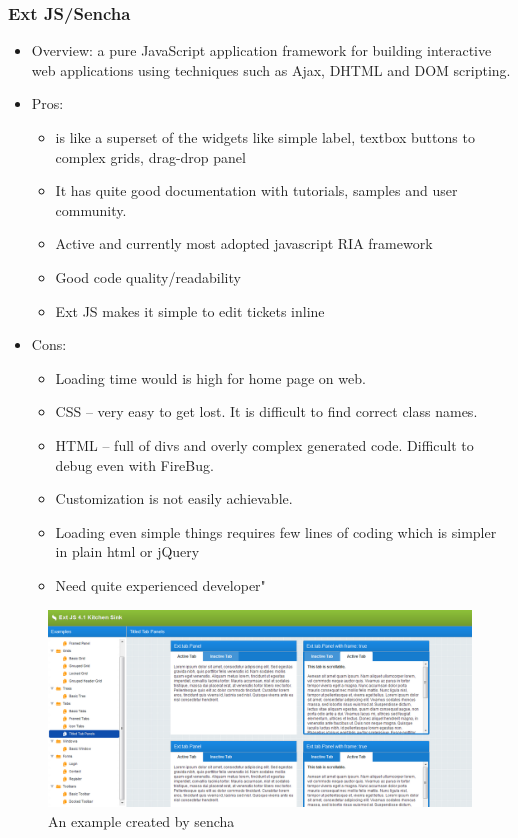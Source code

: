 \documentclass[14pt,a4paper]{extreport}
\begin{document}
		\subsubsection{Ext JS/Sencha}
			\begin{itemize}
				\item Overview:  a pure JavaScript application framework for building interactive web applications using techniques such as Ajax, DHTML and DOM scripting.
				\item Pros: 
					\begin{itemize}
						\item is like a superset of the widgets like simple label, textbox buttons to complex grids, drag-drop panel
						\item It has quite good documentation with tutorials, samples and user community.
						\item Active and currently most adopted javascript RIA framework
						\item  Good code quality/readability
						\item  Ext JS makes it simple to edit tickets inline
					\end{itemize}
				\item Cons:
					\begin{itemize}
						\item Loading time would is high for home page on web.
						\item CSS – very easy to get lost. It is difficult to find correct class names.
						\item HTML – full of divs and overly complex generated code. Difficult to debug even with FireBug.
						\item  Customization is not easily achievable.
						\item Loading even simple things requires few lines of coding which is simpler in plain html or jQuery
						\item Need quite experienced developer"
					\end{itemize}
			\end{itemize}
			
			\begin{figure}
				\begin{center}
				\includegraphics[scale=0.5]{sencha.png}
				\caption{An example created by sencha}
				\end{center}
			\end{figure}
			
\end{document}
